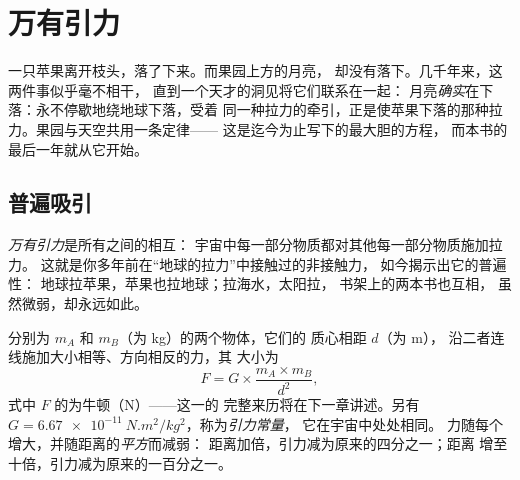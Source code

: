 \chapter{万有引力}\label{ch:g9:gravitation}

一只苹果离开枝头，落了下来。而果园上方的月亮，
却没有落下。几千年来，这两件事似乎毫不相干，
直到一个天才的洞见将它们联系在一起：
月亮\emph{确实}在下落：永不停歇地绕地球下落，受着
同一种拉力的牵引，正是使苹果下落的那种拉力。果园与天空共用一条定律——
这是迄今为止写下的最大胆的方程，
而本书的最后一年就从它开始。

\section{普遍吸引}

\begin{definition}[万有引力]\label{def:g9:gravitation:gravitation}
\emph{万有引力}是所有之间的相互：
宇宙中每一部分物质都对其他每一部分物质施加拉力。
这就是你多年前在“地球的拉力”中接触过的非接触力，
如今揭示出它的普遍性：
地球拉苹果，苹果也拉地球；拉海水，太阳拉，
书架上的两本书也互相，
虽然微弱，却永远如此。
\end{definition}

\begin{proposition}[万有引力定律]\label{prop:g9:gravitation:law}
分别为 $m_A$ 和 $m_B$（为 \unit{kg}）的两个物体，它们的
质心相距 $d$（为 \unit{m}），
沿二者连线施加大小相等、方向相反的力，其
大小为
\[
F = G \times \frac{m_A \times m_B}{d^2},
\]
式中 $F$ 的为牛顿（\unit{N}）——这一的
完整来历将在下一章讲述。另有
$G = \qty{6.67e-11}{N.m^2/kg^2}$，称为\emph{引力常量}，
它在宇宙中处处相同。
力随每个增大，并随距离的\emph{平方}而减弱：
距离加倍，引力减为原来的四分之一；距离
增至十倍，引力减为原来的一百分之一。
\end{proposition}

